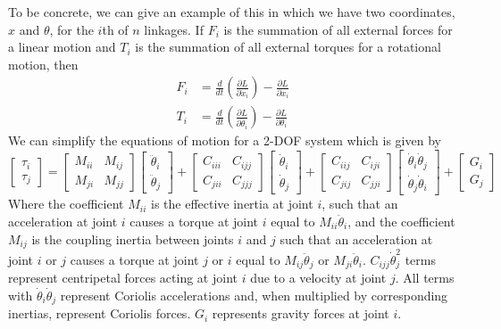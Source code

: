 \documentclass[11pt]{book}
\theoremstyle{example}
\begin{document}
To be concrete, we can give an example of this in which we have two coordinates, $x$ and $\theta$, for the $i$th of $n$ linkages. If $F_i$ is the summation of all external forces for a linear motion and $T_i$ is the summation of all external torques for a rotational motion, then
\begin{equation}
	\begin{aligned}
		F_i&=\frac{d}{dt}\left(\frac{\partial{L}}{\partial\dot{x}_i}\right)-\frac{\partial{L}}{\partial{x_i}}\\
		T_i&=\frac{d}{dt}\left(\frac{\partial{L}}{\partial\dot{\theta}_i}\right)-\frac{\partial{L}}{\partial\theta_i}
	\end{aligned}
\end{equation}
We can simplify the equations of motion for a 2-DOF system which is given by
\begin{equation}
	\begin{bmatrix}
		\tau_i\\
		\tau_j
	\end{bmatrix}=
	\begin{bmatrix}
		M_{ii}&M_{ij}\\
		M_{ji}&M_{jj}
	\end{bmatrix}
	\begin{bmatrix}
		\ddot{\theta}_i\\
		\ddot{\theta}_j
	\end{bmatrix}+
	\begin{bmatrix}
		C_{iii}&C_{ijj}\\
		C_{jii}&C_{jjj}
	\end{bmatrix}
	\begin{bmatrix}
		\dot{\theta}_i\\
		\dot{\theta}_j
	\end{bmatrix}+
	\begin{bmatrix}
		C_{iij}&C_{iji}\\
		C_{jij}&C_{jji}
	\end{bmatrix}
	\begin{bmatrix}
		\dot{\theta}_i\dot{\theta}_j\\
		\dot{\theta}_j\dot{\theta}_i
	\end{bmatrix}+
	\begin{bmatrix}
		G_i\\
		G_j
	\end{bmatrix}
\end{equation}
Where the coefficient $M_{ii}$ is the effective inertia at joint $i$, such that an acceleration at joint $i$ causes a torque at joint $i$ equal to $M_{ii}\ddot{\theta}_i$, and the coefficient $M_{ij}$ is the coupling inertia between joints $i$ and $j$ such that an acceleration at joint $i$ or $j$ causes a torque at joint $j$ or $i$ equal to $M_{ij}\ddot{\theta}_j$ or $M_{ji}\ddot{\theta}_i$. $C_{ijj}\dot{\theta}_j^2$ terms represent centripetal forces acting at joint $i$ due to a velocity at joint $j$. All terms with $\dot{\theta}_i\dot{\theta}_j$ represent Coriolis accelerations and, when multiplied by corresponding inertias, represent Coriolis forces. $G_i$ represents gravity forces at joint $i$.
\end{document}
